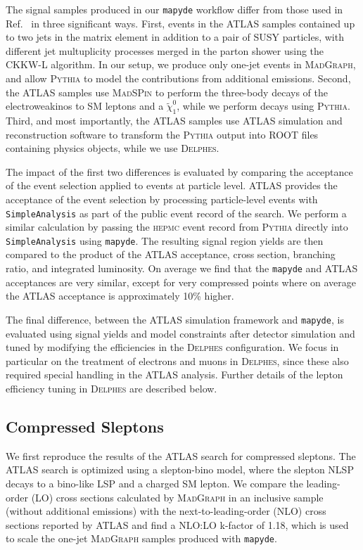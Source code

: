 \documentclass{article}
\newcommand{\chioz}{\ensuremath{\widetilde{\chi}_{1}^{0}}}
\newcommand{\mapyde}{\texttt{mapyde}}
\newcommand{\simpleanalysis}{\texttt{SimpleAnalysis}}
\newcommand{\madgraph}{\textsc{MadGraph}}
\newcommand{\madspin}{\textsc{MadSPin}}
\newcommand{\pythia}{\textsc{Pythia}}
\newcommand{\delphes}{\textsc{Delphes}}
\newcommand{\hepmc}{\textsc{hepmc}}
\begin{document}
The signal samples produced in our \mapyde{} workflow differ from those used in Ref.~\cite{ATLAS:2019lng} in three significant ways.  First, events in the ATLAS samples contained up to two jets in the matrix element in addition to a pair of SUSY particles, with different jet multuplicity processes merged in the parton shower using the CKKW-L algorithm.  In our setup, we produce only one-jet events in \madgraph, and allow \pythia{} to model the contributions from additional emissions.  Second, the ATLAS samples use \madspin{} to perform the three-body decays of the electroweakinos to SM leptons and a \chioz, while we perform decays using \pythia.  Third, and most importantly, the ATLAS samples use ATLAS simulation and reconstruction software to transform the \pythia{} output into ROOT files containing physics objects, while we use \delphes.

The impact of the first two differences is evaluated by comparing the acceptance of the event selection applied to events at particle level.  ATLAS provides the acceptance of the event selection by processing particle-level events with \simpleanalysis{} as part of the public event record of the search.  We perform a similar calculation by passing the \hepmc{} event record from \pythia{} directly into \simpleanalysis{} using \mapyde.  The resulting signal region yields are then compared to the product of the ATLAS acceptance, cross section, branching ratio, and integrated luminosity.  On average we find that the \mapyde{} and ATLAS acceptances are very similar, except for very compressed points where on average the ATLAS acceptance is approximately 10\% higher.

The final difference, between the ATLAS simulation framework and \mapyde, is evaluated using signal yields and model constraints after detector simulation and tuned by modifying the efficiencies in the \delphes{} configuration.  We focus in particular on the treatment of electrons and muons in \delphes, since these also required special handling in the ATLAS analysis.  Further details of the lepton efficiency tuning in \delphes{} are described below.

\subsection{Compressed Sleptons}
\label{ssec:compressed-sleptons}

We first reproduce the results of the ATLAS search for compressed sleptons.  The ATLAS search is optimized using a slepton-bino model, where the slepton NLSP decays to a bino-like LSP and a charged SM lepton.  We compare the leading-order (LO) cross sections calculated by \madgraph{} in an inclusive sample (without additional emissions) with the next-to-leading-order (NLO) cross sections reported by ATLAS and find a NLO:LO k-factor of 1.18, which is used to scale the one-jet \madgraph{} samples produced with \mapyde.
\end{document}
